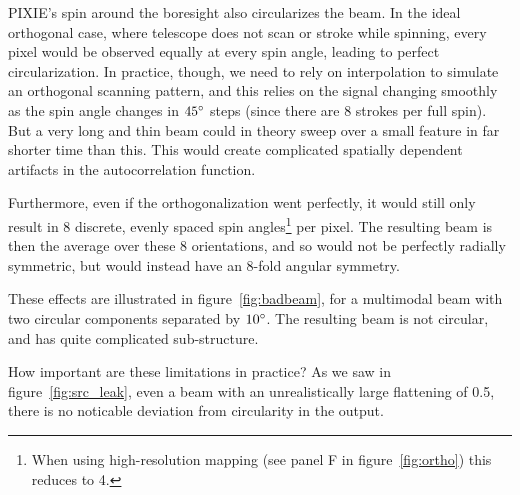 \documentclass{article}
\begin{document}
PIXIE's spin around the boresight also circularizes the beam. In the ideal
orthogonal case, where telescope does not scan or stroke while spinning, every
pixel would be observed equally at every spin angle, leading to perfect
circularization. In practice, though, we need to rely on interpolation to
simulate an orthogonal scanning pattern, and this relies on the signal changing
smoothly as the spin angle changes in $45\degree$ steps (since there are 8
strokes per full spin). But a very long and thin beam could in theory sweep
over a small feature in far shorter time than this. This would create
complicated spatially dependent artifacts in the autocorrelation function.

Furthermore, even if the orthogonalization went perfectly, it would still only
result in 8 discrete, evenly spaced spin angles\footnote{When using
high-resolution mapping (see panel F in figure~\ref{fig:ortho}) this reduces to
4.} per pixel. The resulting beam is then the average over these 8
orientations, and so would not be perfectly radially symmetric, but would
instead have an 8-fold angular symmetry.

These effects are illustrated in figure~\ref{fig:badbeam}, for a
multimodal beam with two circular components separated by $10\degree$.
The resulting beam is not circular, and has quite complicated sub-structure.

How important are these limitations in practice? As we saw in
figure~\ref{fig:src_leak}, even a beam with an unrealistically large
flattening of 0.5, there is no noticable deviation from circularity in
the output.
\end{document}
